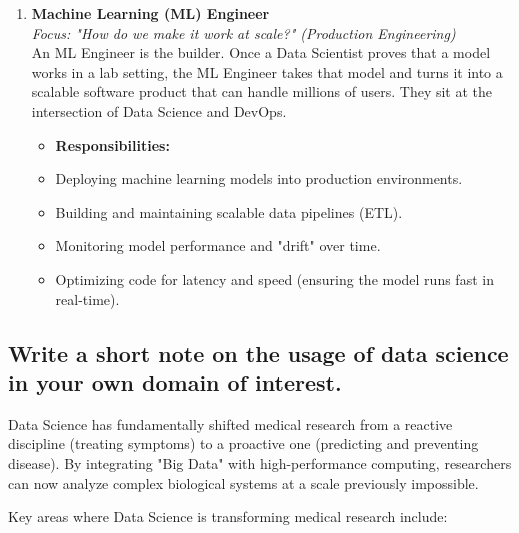 \documentclass[a4paper,12pt]{article}
\begin{document}
\begin{enumerate}
    \item \textbf{Machine Learning (ML) Engineer} \\
    \textit{Focus: "How do we make it work at scale?" (Production Engineering)} \\
    An ML Engineer is the builder. Once a Data Scientist proves that a model works in a lab setting, the ML Engineer takes that model and turns it into a scalable software product that can handle millions of users. They sit at the intersection of Data Science and DevOps.
    \begin{itemize}
        \item \textbf{Responsibilities:}
        \item Deploying machine learning models into production environments.
        \item Building and maintaining scalable data pipelines (ETL).
        \item Monitoring model performance and "drift" over time.
        \item Optimizing code for latency and speed (ensuring the model runs fast in real-time).
    \end{itemize}
\end{enumerate}

\subsection{Write a short note on the usage of data science in your own domain of interest.}

Data Science has fundamentally shifted medical research from a reactive discipline (treating symptoms) to a proactive one (predicting and preventing disease). By integrating "Big Data" with high-performance computing, researchers can now analyze complex biological systems at a scale previously impossible.

Key areas where Data Science is transforming medical research include:
\end{document}
